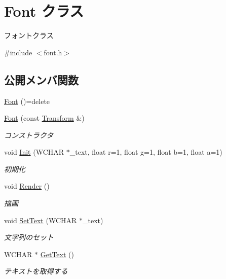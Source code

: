 \hypertarget{class_font}{}\section{Font クラス}
\label{class_font}


フォントクラス  




{\ttfamily \#include $<$font.\+h$>$}

\subsection*{公開メンバ関数}
\begin{DoxyCompactItemize}
\item 
\mbox{\hyperlink{class_font_a2af6642bc26eebff029c74d7827f5ee5}{Font}} ()=delete
\item 
\mbox{\hyperlink{class_font_aa07b69b4e229b2e9efdf0ac49e7a2af1}{Font}} (const \mbox{\hyperlink{class_transform}{Transform}} \&)
\begin{DoxyCompactList}\small\item\em コンストラクタ \end{DoxyCompactList}\item 
void \mbox{\hyperlink{class_font_a35fd445e07010a3ad2c74c93dfa33f66}{Init}} (W\+C\+H\+AR $\ast$\+\_\+text, float r=1, float g=1, float b=1, float a=1)
\begin{DoxyCompactList}\small\item\em 初期化 \end{DoxyCompactList}\item 
void \mbox{\hyperlink{class_font_ad0e36f0066cc8724b6cf6833a15aedbc}{Render}} ()
\begin{DoxyCompactList}\small\item\em 描画 \end{DoxyCompactList}\item 
void \mbox{\hyperlink{class_font_a2c862120802e9aac650a96f7b4e29081}{Set\+Text}} (W\+C\+H\+AR $\ast$\+\_\+text)
\begin{DoxyCompactList}\small\item\em 文字列のセット \end{DoxyCompactList}\item 
W\+C\+H\+AR $\ast$ \mbox{\hyperlink{class_font_a47be569e73a4ba819bf4370463cf929b}{Get\+Text}} ()
\begin{DoxyCompactList}\small\item\em テキストを取得する \end{DoxyCompactList}\end{DoxyCompactItemize}


